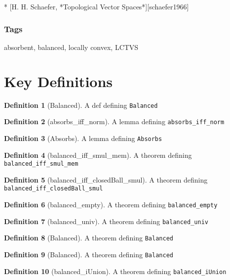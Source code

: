 \documentclass{article}
\theoremstyle{definition}
\newtheorem{definition}{Definition}
\begin{document}
* [H. H. Schaefer, *Topological Vector Spaces*][schaefer1966]

\subsubsection{Tags}

absorbent, balanced, locally convex, LCTVS

\section{Key Definitions}
\begin{definition}[Balanced]
A def defining \texttt{Balanced}
\end{definition}

\begin{definition}[absorbs_iff_norm]
A lemma defining \texttt{absorbs_iff_norm}
\end{definition}

\begin{definition}[Absorbs]
A lemma defining \texttt{Absorbs}
\end{definition}

\begin{definition}[balanced_iff_smul_mem]
A theorem defining \texttt{balanced_iff_smul_mem}
\end{definition}

\begin{definition}[balanced_iff_closedBall_smul]
A theorem defining \texttt{balanced_iff_closedBall_smul}
\end{definition}

\begin{definition}[balanced_empty]
A theorem defining \texttt{balanced_empty}
\end{definition}

\begin{definition}[balanced_univ]
A theorem defining \texttt{balanced_univ}
\end{definition}

\begin{definition}[Balanced]
A theorem defining \texttt{Balanced}
\end{definition}

\begin{definition}[Balanced]
A theorem defining \texttt{Balanced}
\end{definition}

\begin{definition}[balanced_iUnion]
A theorem defining \texttt{balanced_iUnion}
\end{definition}
\end{document}
